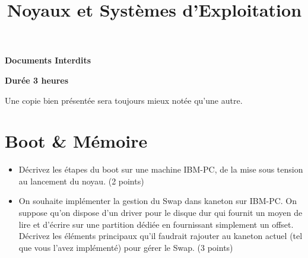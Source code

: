 %
%
%
%
%
%

%
%

%
%

\def\path{../../..}

%
%



%
%

\title{Noyaux et Syst\`emes d'Exploitation}

%
%

\rhead{}

%
%



%
%

\maketitle

%
%

\indentation{}

%
%

\begin{center}

\textbf{Documents Interdits}

\textbf{Dur\'ee 3 heures}

\scriptsize{Une copie bien pr\'esent\'ee sera toujours mieux not\'ee
            qu'une autre.}

\end{center}

%
%

%
%

\section{Boot \& M\'emoire
         {\hfill{} }}

\begin{itemize}
  \item
    D\'ecrivez les \'etapes du boot sur une machine IBM-PC, de la mise
    sous tension au lancement du noyau. (2 points)
  \item
    On souhaite impl\'ementer la gestion du Swap dans kaneton sur IBM-PC.
    On suppose qu'on dispose d'un driver pour le disque dur qui fournit un
    moyen de lire et d'\'ecrire sur une partition d\'edi\'ee en fournissant
    simplement un offset. D\'ecrivez les \'el\'ements principaux qu'il
    faudrait rajouter au kaneton actuel (tel que vous l'avez impl\'ement\'e)
    pour g\'erer le Swap. (3 points)
\end{itemize}

